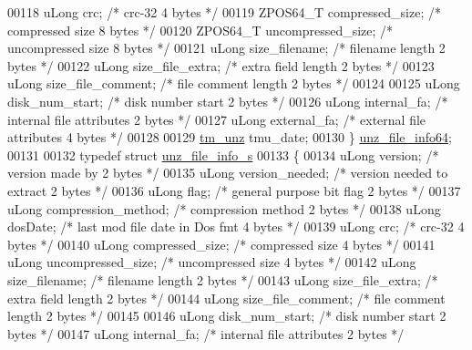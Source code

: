\begin{DoxyCode}
00118     uLong crc;                  \textcolor{comment}{/* crc-32                          4 bytes */}
00119     ZPOS64\_T compressed\_size;   \textcolor{comment}{/* compressed size                 8 bytes */}
00120     ZPOS64\_T uncompressed\_size; \textcolor{comment}{/* uncompressed size               8 bytes */}
00121     uLong size\_filename;        \textcolor{comment}{/* filename length                 2 bytes */}
00122     uLong size\_file\_extra;      \textcolor{comment}{/* extra field length              2 bytes */}
00123     uLong size\_file\_comment;    \textcolor{comment}{/* file comment length             2 bytes */}
00124 
00125     uLong disk\_num\_start;       \textcolor{comment}{/* disk number start               2 bytes */}
00126     uLong internal\_fa;          \textcolor{comment}{/* internal file attributes        2 bytes */}
00127     uLong external\_fa;          \textcolor{comment}{/* external file attributes        4 bytes */}
00128 
00129     \hyperlink{structtm__unz__s}{tm\_unz} tmu\_date;
00130 \} \hyperlink{structunz__file__info64__s}{unz\_file\_info64};
00131 
00132 \textcolor{keyword}{typedef} \textcolor{keyword}{struct }\hyperlink{structunz__file__info__s}{unz\_file\_info\_s}
00133 \{
00134     uLong version;              \textcolor{comment}{/* version made by                 2 bytes */}
00135     uLong version\_needed;       \textcolor{comment}{/* version needed to extract       2 bytes */}
00136     uLong flag;                 \textcolor{comment}{/* general purpose bit flag        2 bytes */}
00137     uLong compression\_method;   \textcolor{comment}{/* compression method              2 bytes */}
00138     uLong dosDate;              \textcolor{comment}{/* last mod file date in Dos fmt   4 bytes */}
00139     uLong crc;                  \textcolor{comment}{/* crc-32                          4 bytes */}
00140     uLong compressed\_size;      \textcolor{comment}{/* compressed size                 4 bytes */}
00141     uLong uncompressed\_size;    \textcolor{comment}{/* uncompressed size               4 bytes */}
00142     uLong size\_filename;        \textcolor{comment}{/* filename length                 2 bytes */}
00143     uLong size\_file\_extra;      \textcolor{comment}{/* extra field length              2 bytes */}
00144     uLong size\_file\_comment;    \textcolor{comment}{/* file comment length             2 bytes */}
00145 
00146     uLong disk\_num\_start;       \textcolor{comment}{/* disk number start               2 bytes */}
00147     uLong internal\_fa;          \textcolor{comment}{/* internal file attributes        2 bytes */}

\end{DoxyCode}
